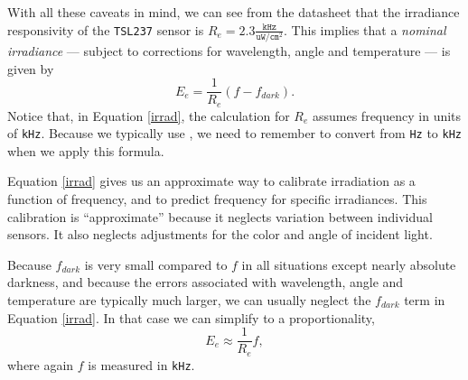 With all these caveats in mind, we can see from the datasheet that the irradiance responsivity of the \texttt{TSL237} sensor is $R_e=2.3 \frac{\mathtt{kHz}}{\mathtt{uW}/\mathtt{cm}^2}$.
This implies that a \emph{nominal irradiance} --- subject to corrections for wavelength, angle and temperature --- is given by
\begin{equation}\label{irrad}
E_e = \frac{1}{R_e} (f-f_{dark}) .
\end{equation}
Notice that, in Equation \ref{irrad}, the calculation for $R_e$ assumes frequency in units of \texttt{kHz}.
Because we typically use , we need to remember to convert from \texttt{Hz} to \texttt{kHz} when we apply this formula.

Equation \ref{irrad} gives us an approximate way to calibrate irradiation as a function of frequency, and to predict frequency for specific irradiances.
This calibration is ``approximate'' because it neglects variation between individual sensors.
It also neglects adjustments for the color and angle of incident light.

Because $f_{dark}$ is very small compared to $f$ in all situations except nearly absolute darkness, and because the errors associated with wavelength, angle and temperature are typically much larger, we can usually neglect the $f_{dark}$ term in Equation \ref{irrad}.
In that case we can simplify to a proportionality,
\begin{equation}\label{irrad2}
E_e \approx \frac{1}{R_e} f,
\end{equation}
where again $f$ is measured in \texttt{kHz}.

